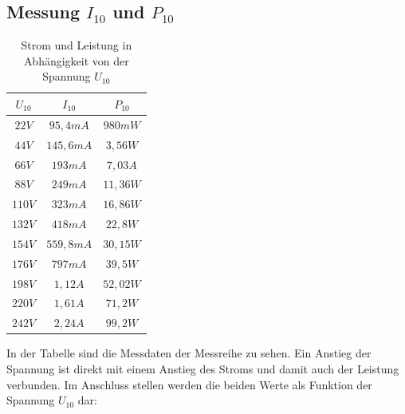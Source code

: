 \documentclass{article}
\begin{document}
\subsection{Messung $I_{10}$ und $P_{10}$}
\label{sec:messung-i_10}
\begin{table}[h]
  \centering
  \begin{tabular}{|c|c|c|}
    \hline
    $U_{10}$ & $I_{10}$ & $P_{10}$ \\
    \hline
    $22V$ & $95,4mA$ & $980mW$ \\
    \hline
    $44V$ & $145,6mA$ & $3,56W$ \\
    \hline
    $66V$ & $193mA$ & $7,03A$ \\
    \hline
    $88V$ & $249mA$ & $11,36W$ \\
    \hline
    $110V$ & $323mA$ & $16,86W$ \\
    \hline
    $132V$ & $418mA$ & $22,8W$ \\
    \hline
    $154V$ & $559,8mA$ & $30,15W$\\
    \hline
    $176V$ & $797mA$ & $39,5W$\\
    \hline
    $198V$ & $1,12A$ & $52,02W$\\
    \hline
    $220V$ & $1,61A$ & $71,2W$\\
    \hline
    $242V$ & $2,24A$ & $99,2W$\\
    \hline
  \end{tabular}
  \caption{Strom und Leistung in Abhängigkeit von der Spannung $U_{10}$}
  \label{tab:fifp}
\end{table}
In der Tabelle sind die Messdaten der Messreihe zu sehen. Ein Anstieg der Spannung ist direkt mit einem Anstieg des Stroms und damit auch der Leistung verbunden.
\newpage
Im Anschluss stellen werden die beiden Werte als Funktion der Spannung $U_{10}$ dar:
\end{document}
